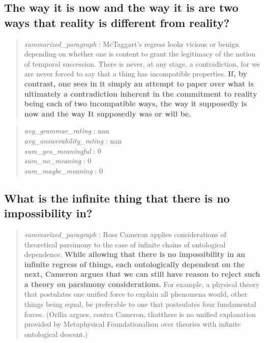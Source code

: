 \hypertarget{the-way-it-is-now-and-the-way-it-is-are-two-ways-that-reality-is-different-from-reality}{%
\subsection{The way it is now and the way it is are two ways that
reality is different from
reality?}\label{the-way-it-is-now-and-the-way-it-is-are-two-ways-that-reality-is-different-from-reality}}

\begin{quote}
\emph{summarized\_paragraph} : McTaggart's regress looks vicious or
benign depending on whether one is content to grant the legitimacy of
the notion of temporal succession. There is never, at any stage, a
contradiction, for we are never forced to say that a thing has
incompatible properties. \textbf{If, by contrast, one sees in it simply
an attempt to paper over what is ultimately a contradiction inherent in
the commitment to reality being each of two incompatible ways, the way
it supposedly is now and the way It supposedly was or will be.}
\end{quote}

\begin{quote}
\emph{avg\_grammar\_rating} : nan\\
\emph{avg\_answerability\_rating} : nan\\
\emph{sum\_yes\_meaningful} : 0\\
\emph{sum\_no\_meaning} : 0\\
\emph{sum\_maybe\_meaning} : 0
\end{quote}

\hypertarget{what-is-the-infinite-thing-that-there-is-no-impossibility-in}{%
\subsection{What is the infinite thing that there is no impossibility
in?}\label{what-is-the-infinite-thing-that-there-is-no-impossibility-in}}

\begin{quote}
\emph{summarized\_paragraph} : Ross Cameron applies considerations of
theoretical parsimony to the case of infinite chains of ontological
dependence. \textbf{While allowing that there is no impossibility in an
infinite regress of things, each ontologically dependent on the next,
Cameron argues that we can still have reason to reject such a theory on
parsimony considerations.} For example, a physical theory that
postulates one unified force to explain all phenomena would, other
things being equal, be preferable to one that postsulates four
fundamental forces. (Orilia argues, contra Cameron, thatthere is no
unified explanation provided by Metaphysical Foundationalism over
theories with infinite ontological descent.)
\end{quote}

